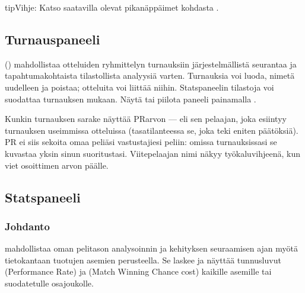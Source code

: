 \documentclass[letterpaper,10pt,finnish]{sphinxmanual}
\begin{document}
\begin{sphinxadmonition}{tip}{Vihje:}
\sphinxAtStartPar
Katso saatavilla olevat pikanäppäimet kohdasta {\hyperref[\detokenize{raccourcis:raccourcis}]{}}.
\end{sphinxadmonition}


\subsection{Turnauspaneeli}
\label{\detokenize{manuel:panneau-tournois}}\label{\detokenize{manuel:id8}}
\sphinxAtStartPar
{} () mahdollistaa otteluiden ryhmittelyn turnauksiin järjestelmällistä seurantaa ja tapahtumakohtaista tilastollista analyysiä varten. Turnauksia voi luoda, nimetä uudelleen ja poistaa; otteluita voi liittää niihin. Stats\sphinxhyphen{}paneelin tilastoja voi suodattaa turnauksen mukaan. Näytä tai piilota paneeli painamalla .

\sphinxAtStartPar
Kunkin turnauksen \sphinxhyphen{}sarake näyttää  PR\sphinxhyphen{}arvon — eli sen pelaajan, joka esiintyy turnauksen useimmissa otteluissa (tasatilanteessa se, joka teki eniten päätöksiä). PR ei siis sekoita omaa peliäsi vastustajiesi peliin: omissa turnauksissasi se kuvastaa yksin sinun suoritustasi. Viitepelaajan nimi näkyy työkaluvihjeenä, kun viet osoittimen arvon päälle.


\subsection{Stats\sphinxhyphen{}paneeli}
\label{\detokenize{manuel:panneau-stats}}\label{\detokenize{manuel:stats}}

\subsubsection{Johdanto}
\label{\detokenize{manuel:id9}}
\sphinxAtStartPar
{} mahdollistaa oman pelitason analysoinnin ja kehityksen seuraamisen ajan myötä tietokantaan tuotujen asemien perusteella. Se laskee ja näyttää tunnusluvut  (Performance Rate) ja  (Match Winning Chance cost) kaikille asemille tai suodatetulle osajoukolle.
\end{document}
